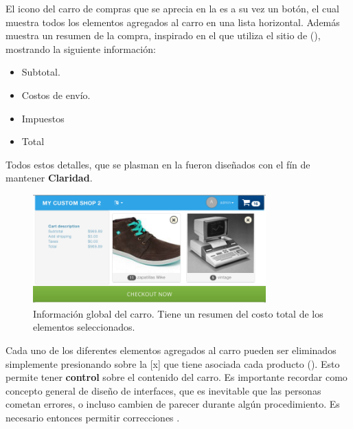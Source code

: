 		El icono del carro de compras que se aprecia en la  es a su vez un botón, el cual muestra todos los elementos agregados al carro en una lista horizontal. Además muestra un resumen de la compra, inspirado en el que utiliza el sitio de \shopifyNAME (), mostrando la siguiente información: 
		\begin{itemize}
			\item
				Subtotal.
			\item
				Costos de envío.
			\item
				Impuestos
			\item
				Total
		\end{itemize}

		Todos estos detalles, que se plasman en la  fueron diseñados con el fín de mantener \textbf{Claridad}.

		\begin{figure}[H]
			\centering
			\includegraphics[width=0.8\textwidth]{figuras/cart/ui/main.png}
			\caption{Información global del carro. Tiene un resumen del costo total de los elementos seleccionados.}
			\label{figure:solution:cart:main}
		\end{figure}

		Cada uno de los diferentes elementos agregados al carro pueden ser eliminados simplemente presionando sobre la [x] que tiene asociada cada producto (). Esto permite tener \textbf{control} sobre el contenido del carro. Es importante recordar como concepto general de diseño de interfaces, que es inevitable que las personas cometan errores, o incluso cambien de parecer durante algún procedimiento. Es necesario entonces permitir correcciones \cite{online_goodgui_org}. 


